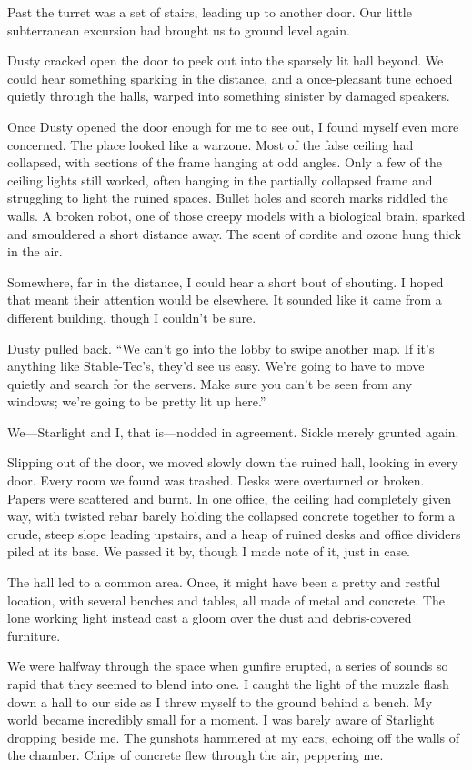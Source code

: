 Past the turret was a set of stairs, leading up to another door. Our little subterranean excursion had brought us to ground level again.

Dusty cracked open the door to peek out into the sparsely lit hall beyond. We could hear something sparking in the distance, and a once-pleasant tune echoed quietly through the halls, warped into something sinister by damaged speakers.

Once Dusty opened the door enough for me to see out, I found myself even more concerned. The place looked like a warzone. Most of the false ceiling had collapsed, with sections of the frame hanging at odd angles. Only a few of the ceiling lights still worked, often hanging in the partially collapsed frame and struggling to light the ruined spaces. Bullet holes and scorch marks riddled the walls. A broken robot, one of those creepy models with a biological brain, sparked and smouldered a short distance away. The scent of cordite and ozone hung thick in the air.

Somewhere, far in the distance, I could hear a short bout of shouting. I hoped that meant their attention would be elsewhere. It sounded like it came from a different building, though I couldn’t be sure.

Dusty pulled back. “We can’t go into the lobby to swipe another map. If it’s anything like Stable-Tec’s, they’d see us easy. We’re going to have to move quietly and search for the servers. Make sure you can’t be seen from any windows; we’re going to be pretty lit up here.”

We—Starlight and I, that is—nodded in agreement. Sickle merely grunted again.

Slipping out of the door, we moved slowly down the ruined hall, looking in every door. Every room we found was trashed. Desks were overturned or broken. Papers were scattered and burnt. In one office, the ceiling had completely given way, with twisted rebar barely holding the collapsed concrete together to form a crude, steep slope leading upstairs, and a heap of ruined desks and office dividers piled at its base. We passed it by, though I made note of it, just in case.

The hall led to a common area. Once, it might have been a pretty and restful location, with several benches and tables, all made of metal and concrete. The lone working light instead cast a gloom over the dust and debris-covered furniture.

We were halfway through the space when gunfire erupted, a series of sounds so rapid that they seemed to blend into one. I caught the light of the muzzle flash down a hall to our side as I threw myself to the ground behind a bench. My world became incredibly small for a moment. I was barely aware of Starlight dropping beside me. The gunshots hammered at my ears, echoing off the walls of the chamber. Chips of concrete flew through the air, peppering me.

